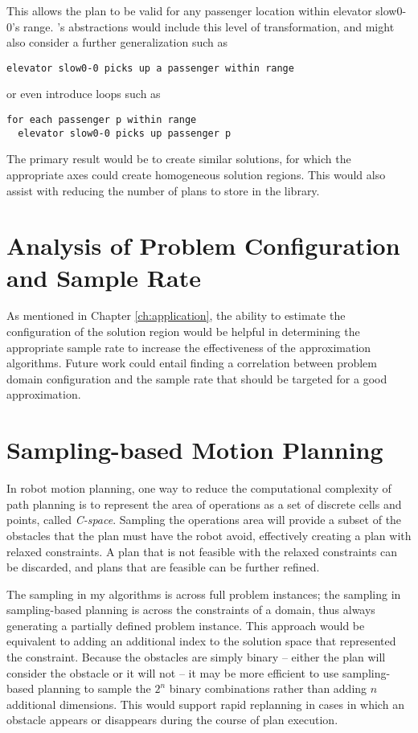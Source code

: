 {\noindent
This allows the plan to be valid for any passenger location within elevator slow0-0's range.  \citeauthor{srivastava08generalized}'s abstractions would include this level of transformation, and might also consider a further generalization such as 

\begin{verbatim}
elevator slow0-0 picks up a passenger within range
\end{verbatim}

\noindent
or even introduce loops such as

\begin{verbatim}
for each passenger p within range
  elevator slow0-0 picks up passenger p
\end{verbatim}

The primary result would be to create similar solutions, for which the appropriate axes could create homogeneous solution regions.  This would also assist with reducing the number of plans to store in the library.

\section{Analysis of Problem Configuration and Sample Rate}
As mentioned in Chapter \ref{ch:application}, the ability to estimate the configuration of the solution region would be helpful in determining the appropriate sample rate to increase the effectiveness of the approximation algorithms.  Future work could entail finding a correlation between problem domain configuration and the sample rate that should be targeted for a good approximation.

\section{Sampling-based Motion Planning}

In robot motion planning, one way to reduce the computational complexity of path planning is to represent the area of operations as a set of discrete cells and points, called \textit{C-space}.  Sampling the operations area will provide a subset of the obstacles that the plan must have the robot avoid, effectively creating a plan with relaxed constraints.  A plan that is not feasible with the relaxed constraints can be discarded, and plans that are feasible can be further refined.  

The sampling in my algorithms is across full problem instances; the sampling in sampling-based planning is across the constraints of a domain, thus always generating a partially defined problem instance.  This approach would be equivalent to adding an additional index to the solution space that represented the constraint.  Because the obstacles are simply binary -- either the plan will consider the obstacle or it will not -- it may be more efficient to use sampling-based planning to sample the $2^n$ binary combinations rather than adding $n$ additional dimensions.  This would support rapid replanning in cases in which an obstacle appears or disappears during the course of plan execution.

}
